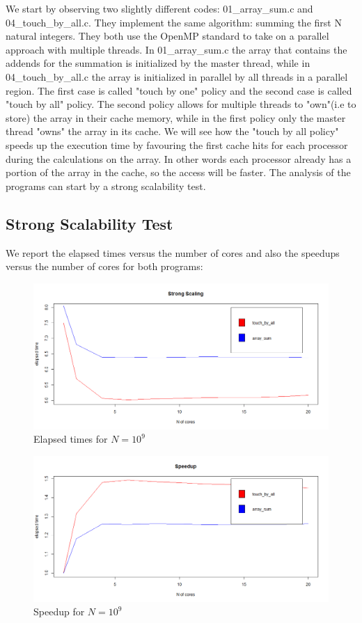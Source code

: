\documentclass{article}
\begin{document}
We start by observing two slightly different codes: 01\_array\_sum.c
and 04\_touch\_by\_all.c. They implement the same algorithm: summing the first N natural integers. They both use the OpenMP standard to take on a parallel approach with multiple threads.
In 01\_array\_sum.c the array that contains the addends for the summation is initialized by the master thread, while in 04\_touch\_by\_all.c the array is initialized in parallel by all threads in a parallel region. The first case is called "touch by one" policy and the second case is called "touch by all" policy.
The second policy allows for multiple threads to "own"(i.e to store) the array in their cache memory, while in the first policy only the master thread "owns" the array in its cache.
We will see how the "touch by all policy" speeds up the execution time by favouring the first cache hits for each processor during the calculations on the array.  In other words each processor already has a portion of the array in the cache, so the access will be faster.
The analysis of the programs can start by a strong scalability test.

\subsection{Strong Scalability Test}
We report the elapsed times versus the number of cores and also the speedups versus the number of cores for both programs:

\begin{figure}[H] %
	\centering
	\includegraphics[width=0.8\columnwidth]{graphs/exercise_0_strongscaling} %
	\caption{Elapsed times for $N=10^9$}
\end{figure}

\begin{figure}[H] %
	\centering
	\includegraphics[width=0.8\columnwidth]{graphs/exercise_0_speedup} %
	\caption{Speedup for $N=10^9$}
\end{figure}
\end{document}
